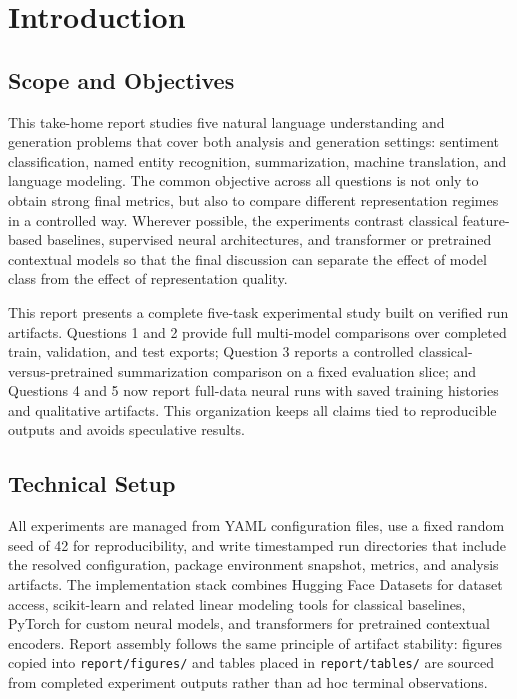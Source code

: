 \section{Introduction}

\subsection{Scope and Objectives}

This take-home report studies five natural language understanding and generation problems that cover both analysis and generation settings: sentiment classification, named entity recognition, summarization, machine translation, and language modeling. The common objective across all questions is not only to obtain strong final metrics, but also to compare different representation regimes in a controlled way. Wherever possible, the experiments contrast classical feature-based baselines, supervised neural architectures, and transformer or pretrained contextual models so that the final discussion can separate the effect of model class from the effect of representation quality.

This report presents a complete five-task experimental study built on verified run artifacts. Questions 1 and 2 provide full multi-model comparisons over completed train, validation, and test exports; Question 3 reports a controlled classical-versus-pretrained summarization comparison on a fixed evaluation slice; and Questions 4 and 5 now report full-data neural runs with saved training histories and qualitative artifacts. This organization keeps all claims tied to reproducible outputs and avoids speculative results.

\subsection{Technical Setup}

All experiments are managed from YAML configuration files, use a fixed random seed of 42 for reproducibility, and write timestamped run directories that include the resolved configuration, package environment snapshot, metrics, and analysis artifacts. The implementation stack combines Hugging Face Datasets for dataset access, scikit-learn and related linear modeling tools for classical baselines, PyTorch for custom neural models, and transformers for pretrained contextual encoders. Report assembly follows the same principle of artifact stability: figures copied into \texttt{report/figures/} and tables placed in \texttt{report/tables/} are sourced from completed experiment outputs rather than ad hoc terminal observations.

